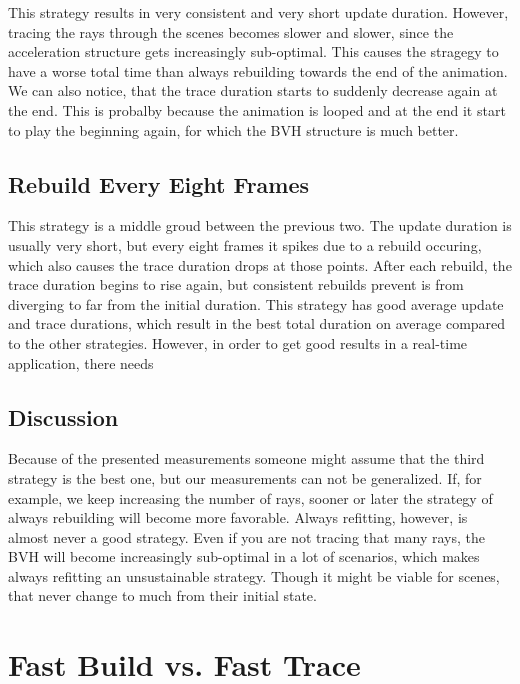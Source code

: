 This strategy results in very consistent and very short update duration. However, tracing the rays through the scenes becomes slower and slower, since the acceleration structure gets increasingly sub-optimal. This causes the stragegy to have a worse total time than always rebuilding towards the end of the animation. We can also notice, that the trace duration starts to suddenly decrease again at the end. This is probalby because the animation is looped and at the end it start to play the beginning again, for which the BVH structure is much better.

\subsection{Rebuild Every Eight Frames}

This strategy is a middle groud between the previous two. The update duration is usually very short, but every eight frames it spikes due to a rebuild occuring, which also causes the trace duration drops at those points. After each rebuild, the trace duration begins to rise again, but consistent rebuilds prevent is from diverging to far from the initial duration. This strategy has good average update and trace durations, which result in the best total duration on average compared to the other strategies. However, in order to get good results in a real-time application, there needs

\subsection{Discussion}

Because of the presented measurements someone might assume that the third strategy is the best one, but our measurements can not be generalized. If, for example, we keep increasing the number of rays, sooner or later the strategy of always rebuilding will become more favorable. Always refitting, however, is almost never a good strategy. Even if you are not tracing that many rays, the BVH will become increasingly sub-optimal in a lot of scenarios, which makes always refitting an unsustainable strategy. Though it might be viable for scenes, that never change to much from their initial state.

\section{Fast Build vs. Fast Trace}

